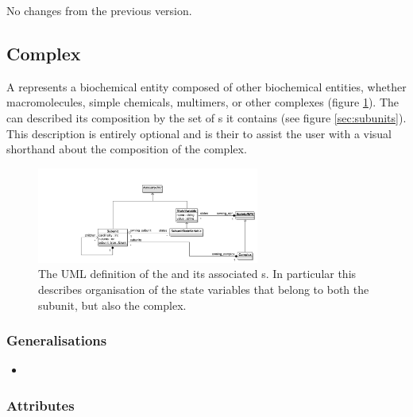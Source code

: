 No changes from the previous version.


\subsection{Complex}\label{sec:complex}
\label{defn:Complex}

A  represents a biochemical entity composed of
other biochemical entities, whether macromolecules, simple chemicals,
multimers, or other complexes (figure
\ref{fig:complexsubunituml}). The  can described
its composition by the set of s it contains (see
figure \ref{sec:subunits}). This description is entirely optional and
is their to assist the user with a visual shorthand about the
composition of the complex.

\begin{figure}[htb]
  \centering
  \includegraphics[width = 0.65\textwidth]{images/complexsubunituml}
  \caption{The UML definition of the  and its
    associated s. In particular this describes organisation
   of the state variables that belong to both the subunit, but also
   the complex.}
  \label{fig:complexsubunituml}
\end{figure}

\subsubsection{Generalisations}

\begin{itemize}
\item {} 
\end{itemize}

\subsubsection{Attributes}

